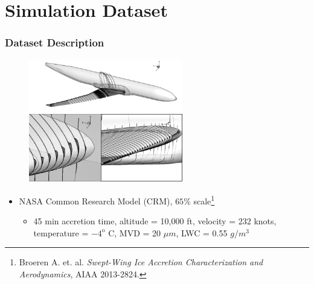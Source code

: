 \documentclass[9pt]{beamer}
\begin{document}
\section{Simulation Dataset}
\label{sec-3}
\begin{frame}
\frametitle{Dataset Description}
\label{sec-3-1}

\begin{figure}
  \centering
  \includegraphics[width=0.6\textwidth]{CRMHorn}
\end{figure}

\begin{itemize}
\item NASA Common Research Model (CRM), $65\%$ scale\footnote{Broeren A. et. al. \emph{Swept-Wing Ice Accretion Characterization and Aerodynamics}, AIAA 2013-2824.
 }
\begin{itemize}
\item 45 min accretion time, altitude = 10,000 ft, velocity = 232 knots,
    temperature = $-4^{\text{o}}$ C, MVD = 20 $\mu m$, LWC = 0.55
    $g/m^3$
\end{itemize}
\end{itemize}
\end{frame}
\end{document}
